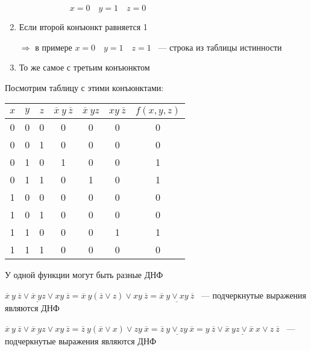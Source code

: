 \documentclass[russian]{lecture-notes}
\begin{document}
\begin{sloppypar}
\begin{enumerate}
{		$ \qquad \qquad \qquad x = 0 \quad y = 1 \quad z = 0$	
	}
	\item{
		Если второй конъюнкт равняется 1
		
		$\Rightarrow$ в примере $x = 0 \quad y = 1 \quad z = 1$ ~--- строка из таблицы истинности	
	}
	\item{
		То же самое с третьим конъюнктом
	}
\end{enumerate}

Посмотрим таблицу с этими конъюнктами:

\begin{table}[h!]
	\centering
	\begin{tabular}{|c|c|c|c|c|c|c|}
		\hline
		$x$ & $y$ & $z$ & $\overline{x} \: y \: \overline{z}$ & $\overline{x} \: yz$ & $xy \: \overline{z}$ & $f(x, y, z)$ \\ \hline
		0 & 0 & 0 & 0   & 0   & 0   & 0 \\ \hline
		0 & 0 & 1 & 0   & 0   & 0   & 0 \\ \hline
		0 & 1 & 0 & 1   & 0   & 0   & 1 \\ \hline
		0 & 1 & 1 & 0   & 1   & 0   & 1 \\ \hline
		1 & 0 & 0 & 0   & 0   & 0   & 0 \\ \hline
		1 & 0 & 1 & 0   & 0   & 0   & 0 \\ \hline
		1 & 1 & 0 & 0   & 0   & 1   & 1 \\ \hline
		1 & 1 & 1 & 0   & 0   & 0   & 0 \\ \hline
	\end{tabular}
\end{table}

\begin{remark}
	У одной функции могут быть разные ДНФ
\end{remark}

\begin{example}
	$\underline{\overline{x} \: y \: \overline{z} \lor \overline{x} \: yz \lor xy \: \overline{z}} = \overline{x} \: y (\overline{z} \lor z) \lor xy \: \overline{z} = \underline{\overline{x} \: y \lor xy \: \overline{z}}$ ~--- подчеркнутые выражения являются ДНФ
\end{example}

\begin{example}
	$\underline{\overline{x} \: y \: \overline{z} \lor \overline{x} \: yz \lor xy \: \overline{z}} = \overline{z} \: y (\overline{x} \lor x) \lor zy \: \overline{x} = \underline{\overline{z} \: y \lor zy \: \overline{x}} = \underline{y \: \overline{z} \lor \overline{x} \: yz \lor \overline{x} \: x \lor z \: \overline{z}}$ ~--- подчеркнутые выражения являются ДНФ
\end{example}


\end{sloppypar}
\end{document}

